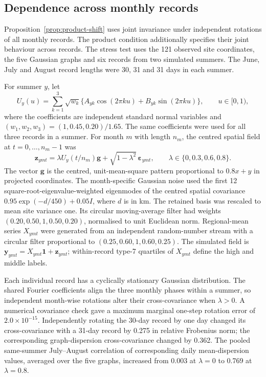 \documentclass[namedate,webpdf,modern,mediumone]{oup-authoring-template}
\theoremstyle{thmstyleone}
\begin{document}


\subsection{Dependence across monthly records}
\label{sec:cross-record-stress}

Proposition~\ref{prop:product-shift} uses joint invariance under independent
rotations of all monthly records. The product condition additionally specifies
their joint behaviour across records. The stress test uses the 121
observed site coordinates, the five Gaussian graphs and six records from
two simulated summers. The June, July and August record lengths were 30, 31 and
31 days in each summer.

For summer $y$, let
\[
 U_y(u)=\sum_{k=1}^{3}\sqrt{w_k}
 \{A_{yk}\cos(2\pi ku)+B_{yk}\sin(2\pi ku)\},
 \qquad u\in[0,1),
\]
where the coefficients are independent standard normal variables and
$(w_1,w_2,w_3)=(1,0.45,0.20)/1.65$. The same coefficients were used for all
three records in a summer. For month $m$ with length $n_m$, the centred spatial
field at $t=0,\ldots,n_m-1$ was
\[
 \mathbf z_{ymt}=\lambda U_y(t/n_m)\mathbf g
 +\sqrt{1-\lambda^2}\,\boldsymbol\varepsilon_{ymt},
 \qquad \lambda\in\{0,0.3,0.6,0.8\}.
\]
The vector $\mathbf g$ is the centred, unit-mean-square pattern proportional to
$0.8x+y$ in projected coordinates. The month-specific Gaussian noise used the
first 12 square-root-eigenvalue-weighted eigenmodes of the centred spatial
covariance $0.95\exp(-d/450)+0.05I$, where $d$ is in km. The retained basis was
rescaled to mean site variance one. Its circular moving-average filter had
weights $(0.20,0.50,1,0.50,0.20)$, normalised to unit Euclidean norm.
Regional-mean series $X_{ymt}$ were generated from an independent random-number
stream with a circular filter proportional to $(0.25,0.60,1,0.60,0.25)$.
The simulated field is $\mathbf y_{ymt}=X_{ymt}\mathbf 1+\mathbf z_{ymt}$;
within-record type-7 quartiles of $X_{ymt}$ define the high and middle labels.

Each individual record has a cyclically stationary Gaussian distribution. The
shared Fourier coefficients align the three monthly phases within a summer, so
independent month-wise rotations alter their cross-covariance when $\lambda>0$.
A numerical covariance check gave a maximum marginal one-step rotation error of
$2.0\times10^{-15}$. Independently rotating the 30-day record by one day
changed its cross-covariance with a 31-day record by 0.275 in relative
Frobenius norm; the corresponding graph-dispersion cross-covariance changed by
0.362. The pooled same-summer July--August correlation of corresponding daily
mean-dispersion values, averaged over the five graphs, increased from 0.003 at
$\lambda=0$ to 0.769 at $\lambda=0.8$.
\end{document}
